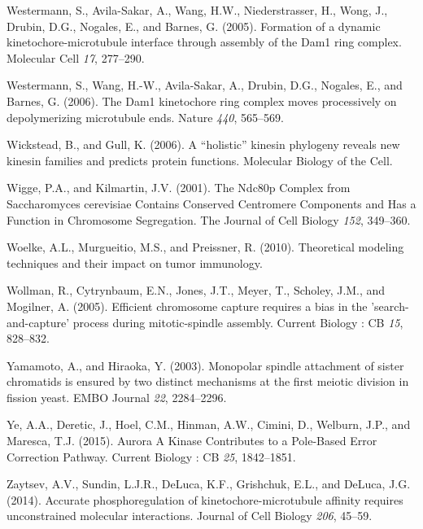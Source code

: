 \documentclass[12pt,a4paper,twoside,openright]{book}
\begin{document}
\hypertarget{ref-Westermann2005}{}
Westermann, S., Avila-Sakar, A., Wang, H.W., Niederstrasser, H., Wong,
J., Drubin, D.G., Nogales, E., and Barnes, G. (2005). Formation of a
dynamic kinetochore-microtubule interface through assembly of the Dam1
ring complex. Molecular Cell \emph{17}, 277--290.

\hypertarget{ref-Westermann2006}{}
Westermann, S., Wang, H.-W., Avila-Sakar, A., Drubin, D.G., Nogales, E.,
and Barnes, G. (2006). The Dam1 kinetochore ring complex moves
processively on depolymerizing microtubule ends. Nature \emph{440},
565--569.

\hypertarget{ref-Wickstead2006}{}
Wickstead, B., and Gull, K. (2006). A ``holistic'' kinesin phylogeny
reveals new kinesin families and predicts protein functions. Molecular
Biology of the Cell.

\hypertarget{ref-Wigge2001}{}
Wigge, P.A., and Kilmartin, J.V. (2001). The Ndc80p Complex from
Saccharomyces cerevisiae Contains Conserved Centromere Components and
Has a Function in Chromosome Segregation. The Journal of Cell Biology
\emph{152}, 349--360.

\hypertarget{ref-Woelke2010}{}
Woelke, A.L., Murgueitio, M.S., and Preissner, R. (2010). Theoretical
modeling techniques and their impact on tumor immunology.

\hypertarget{ref-Wollman2005}{}
Wollman, R., Cytrynbaum, E.N., Jones, J.T., Meyer, T., Scholey, J.M.,
and Mogilner, A. (2005). Efficient chromosome capture requires a bias in
the 'search-and-capture' process during mitotic-spindle assembly.
Current Biology : CB \emph{15}, 828--832.

\hypertarget{ref-Yamamoto2003}{}
Yamamoto, A., and Hiraoka, Y. (2003). Monopolar spindle attachment of
sister chromatids is ensured by two distinct mechanisms at the first
meiotic division in fission yeast. EMBO Journal \emph{22}, 2284--2296.

\hypertarget{ref-Ye2015}{}
Ye, A.A., Deretic, J., Hoel, C.M., Hinman, A.W., Cimini, D., Welburn,
J.P., and Maresca, T.J. (2015). Aurora A Kinase Contributes to a
Pole-Based Error Correction Pathway. Current Biology : CB \emph{25},
1842--1851.

\hypertarget{ref-Zaytsev2014}{}
Zaytsev, A.V., Sundin, L.J.R., DeLuca, K.F., Grishchuk, E.L., and
DeLuca, J.G. (2014). Accurate phosphoregulation of
kinetochore-microtubule affinity requires unconstrained molecular
interactions. Journal of Cell Biology \emph{206}, 45--59.
\end{document}
